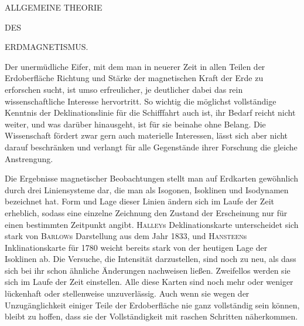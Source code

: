 \renewcommand{\Article}[1]{\par\medskip\Needspace{4\baselineskip}\pdfbookmark[1]{Art. #1}{erdmagnetismus-art-#1}\centerline{\textbf{#1.}}\nobreak\smallskip}
\par\medskip
\centerline{ALLGEMEINE THEORIE}
\centerline{DES}
\centerline{ERDMAGNETISMUS.}
\medskip
Der unermüdliche Eifer, mit dem man in neuerer Zeit in allen Teilen der Erdoberfläche Richtung und Stärke der magnetischen Kraft der Erde zu erforschen sucht, ist umso erfreulicher, je deutlicher dabei das rein wissenschaftliche Interesse hervortritt. So wichtig die möglichst vollständige Kenntnis der Deklinationslinie für die Schifffahrt auch ist, ihr Bedarf reicht nicht weiter, und was darüber hinausgeht, ist für sie beinahe ohne Belang. Die Wissenschaft fördert zwar gern auch materielle Interessen, lässt sich aber nicht darauf beschränken und verlangt für alle Gegenstände ihrer Forschung die gleiche Anstrengung.

Die Ergebnisse magnetischer Beobachtungen stellt man auf Erdkarten gewöhnlich durch drei Liniensysteme dar, die man als Isogonen, Isoklinen und Isodynamen bezeichnet hat. Form und Lage dieser Linien ändern sich im Laufe der Zeit erheblich, sodass eine einzelne Zeichnung den Zustand der Erscheinung nur für einen bestimmten Zeitpunkt angibt. \textsc{Halley}s Deklinationskarte unterscheidet sich stark von \textsc{Barlow}s Darstellung aus dem Jahr 1833, und \textsc{Hansteen}s Inklinationskarte für 1780 weicht bereits stark von der heutigen Lage der Isoklinen ab. Die Versuche, die Intensität darzustellen, sind noch zu neu, als dass sich bei ihr schon ähnliche Änderungen nachweisen ließen. Zweifellos werden sie sich im Laufe der Zeit einstellen. Alle diese Karten sind noch mehr oder weniger lückenhaft oder stellenweise unzuverlässig. Auch wenn sie wegen der Unzugänglichkeit einiger Teile der Erdoberfläche nie ganz vollständig sein können, bleibt zu hoffen, dass sie der Vollständigkeit mit raschen Schritten näherkommen.


